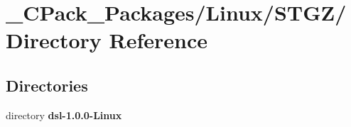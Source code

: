 \section{\_\-CPack\_\-Packages/Linux/STGZ/ Directory Reference}
\label{dir_cbab0df183e923a5a2b33ddcfe885653}
\subsection*{Directories}
\begin{DoxyCompactItemize}
\item 
directory {\bf dsl-\/1.0.0-\/Linux}
\end{DoxyCompactItemize}
